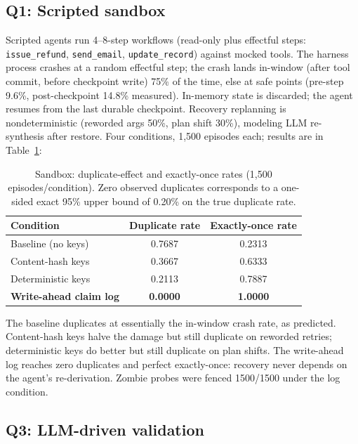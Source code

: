 \documentclass[10pt,journal,compsoc]{IEEEtran}
\begin{document}
\subsection{Q1: Scripted sandbox}

Scripted agents run 4--8-step workflows (read-only plus
effectful steps: \texttt{issue\_refund}, \texttt{send\_email},
\texttt{update\_record}) against mocked tools. The harness
process crashes at a random effectful step; the crash lands
in-window (after tool commit, before checkpoint write) 75\% of
the time, else at safe points (pre-step 9.6\%, post-checkpoint
14.8\% measured). In-memory state is discarded; the agent
resumes from the last durable checkpoint. Recovery replanning
is nondeterministic (reworded args 50\%, plan shift 30\%),
modeling LLM re-synthesis after restore. Four conditions,
1,500 episodes each; results are in Table~\ref{tab:sandbox}:

\begin{table}[ht]
\centering
\caption{Sandbox: duplicate-effect and exactly-once rates
(1,500 episodes/condition). Zero observed duplicates corresponds
to a one-sided exact 95\% upper bound of 0.20\% on the true
duplicate rate.}
\label{tab:sandbox}
\begin{tabular}{lcc}
\toprule
Condition & Duplicate rate & Exactly-once rate \\
\midrule
Baseline (no keys) & 0.7687 & 0.2313 \\
Content-hash keys & 0.3667 & 0.6333 \\
Deterministic keys & 0.2113 & 0.7887 \\
\textbf{Write-ahead claim log} & \textbf{0.0000} & \textbf{1.0000} \\
\bottomrule
\end{tabular}
\end{table}

The baseline duplicates at essentially the in-window crash
rate, as predicted. Content-hash keys halve the damage but
still duplicate on reworded retries; deterministic keys do
better but still duplicate on plan shifts. The write-ahead log
reaches zero duplicates and perfect exactly-once: recovery
never depends on the agent's re-derivation. Zombie probes
were fenced 1500/1500 under the log condition.

\subsection{Q3: LLM-driven validation}
\end{document}
